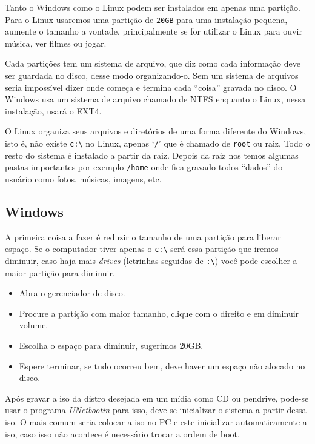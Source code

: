 \documentclass{handout_utfpr}
\begin{document}
Tanto o Windows como o Linux podem ser instalados em apenas uma partição. Para o Linux usaremos uma partição de \texttt{20GB} para uma instalação pequena, aumente o tamanho a vontade, principalmente se for utilizar o Linux para ouvir música, ver filmes ou jogar. 

Cada partições tem um sistema de arquivo, que diz como cada informação deve ser guardada no disco, desse modo organizando-o. Sem um sistema de arquivos seria impossível dizer onde começa e termina cada ``coisa'' gravada no disco. O Windows usa um sistema de arquivo chamado de NTFS enquanto o Linux, nessa instalação, usará o EXT4.

O Linux organiza seus arquivos e diretórios de uma forma diferente do Windows, isto é, não existe \texttt{c:\textbackslash} no Linux, apenas `\texttt{/}' que é chamado de \texttt{root} ou raiz. Todo o resto do sistema é instalado a partir da raiz. Depois da raiz nos temos algumas pastas importantes por exemplo \texttt{/home} onde fica gravado todos ``dados'' do usuário como fotos, músicas, imagens, etc.

\subsection{Windows}
A primeira coisa a fazer é reduzir o tamanho de uma partição para liberar espaço. Se o computador tiver apenas o \texttt{c:\textbackslash} será essa partição que iremos diminuir, caso haja mais \emph{drives} (letrinhas seguidas de \texttt{:\textbackslash}) você pode escolher a maior partição para diminuir.

\begin{itemize}
    \item Abra o gerenciador de disco.
    \item Procure a partição com maior tamanho, clique com o direito e em diminuir volume.
    \item Escolha o espaço para diminuir, sugerimos 20GB.
    \item Espere terminar, se tudo ocorreu bem, deve haver um espaço não alocado no disco.
\end{itemize}

Após gravar a iso da distro desejada em um mídia como CD ou pendrive, pode-se usar o programa \emph{UNetbootin} para isso, deve-se inicializar o sistema a partir dessa iso. O mais comum seria colocar a iso no PC e este inicializar automaticamente a iso, caso isso não acontece é necessário trocar a ordem de boot.
\end{document}
